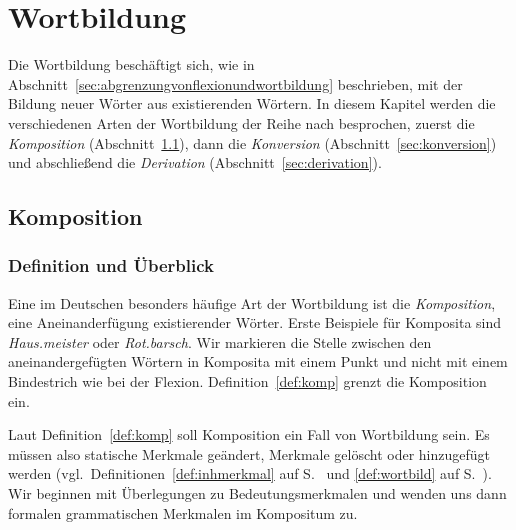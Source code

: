 \chapter{Wortbildung}
\label{sec:wortbildung}

Die Wortbildung beschäftigt sich, wie in Abschnitt~\ref{sec:abgrenzungvonflexionundwortbildung} beschrieben, mit der Bildung neuer Wörter aus existierenden Wörtern.
In diesem Kapitel werden die verschiedenen Arten der Wortbildung der Reihe nach besprochen, zuerst die \textit{Komposition} (Abschnitt~\ref{sec:komposition}), dann die \textit{Konversion} (Abschnitt~\ref{sec:konversion}) und abschließend die \textit{Derivation} (Abschnitt~\ref{sec:derivation}).

\section{Komposition}
\label{sec:komposition}

\subsection{Definition und Überblick}
\label{sec:definitionundueberblick}


Eine im Deutschen besonders häufige Art der Wortbildung ist die \textit{Komposition}, eine Aneinanderfügung existierender Wörter.
Erste Beispiele für Komposita sind \textit{Haus.meister} oder \textit{Rot.barsch}.
Wir markieren die Stelle zwischen den aneinandergefügten Wörtern in Komposita mit einem Punkt und nicht mit einem Bindestrich wie bei der Flexion.
Definition~\ref{def:komp} grenzt die Komposition ein.


Laut Definition~\ref{def:komp} soll Komposition ein Fall von Wortbildung sein.
Es müssen also statische Merkmale geändert, Merkmale gelöscht oder hinzugefügt werden (vgl.\ Definitionen~\ref{def:inhmerkmal} auf S.~\pageref{def:inhmerkmal} und \ref{def:wortbild} auf S.~\pageref{def:wortbild}).
Wir beginnen mit Überlegungen zu Bedeutungsmerkmalen und wenden uns dann formalen grammatischen Merkmalen im Kompositum zu.

